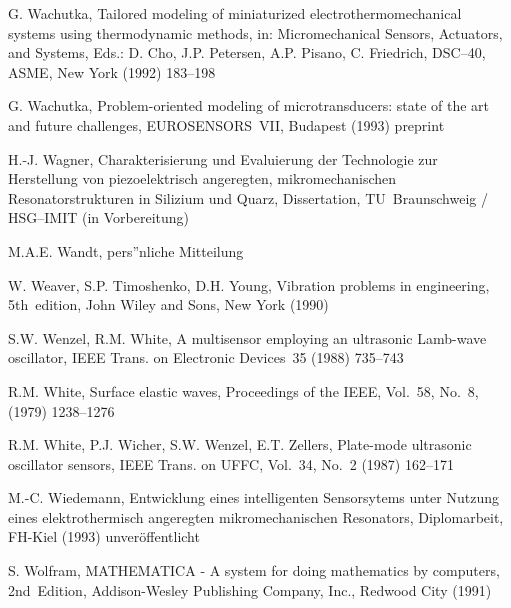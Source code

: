 \begin{thebibliography}{xxx}
 G. Wachutka, Tailored modeling of miniaturized electrothermomechanical
 systems using thermodynamic methods, in: Micromechanical Sensors,
 Actuators, and Systems, Eds.: D. Cho, J.P. Petersen, A.P. Pisano,
 C. Friedrich, DSC--40, ASME, New York (1992) 183--198

 G. Wachutka, Problem-oriented modeling of microtransducers: state of the
 art and future challenges, EUROSENSORS~VII, Budapest (1993) preprint


 H.-J. Wagner, Charakterisierung und Evaluierung der Technologie zur
 Herstellung von piezoelektrisch angeregten, mikromechanischen
 Resonatorstrukturen in Silizium und Quarz, Dissertation,
 TU~Braunschweig / HSG--IMIT (in Vorbereitung)

 M.A.E. Wandt, pers”nliche Mitteilung

 W. Weaver, S.P. Timoshenko, D.H. Young, Vibration problems in engineering,
 5th~edition, John Wiley and Sons, New York (1990)

 S.W. Wenzel, R.M. White, A multisensor employing an ultrasonic Lamb-wave
 oscillator, IEEE Trans. on Electronic Devices~35 (1988) 735--743

 R.M. White, Surface elastic waves, Proceedings of the IEEE, Vol.~58, No.~8,
 (1979) 1238--1276

 R.M. White, P.J. Wicher, S.W. Wenzel, E.T. Zellers, Plate-mode ultrasonic
 oscillator sensors, IEEE Trans. on UFFC, Vol.~34, No.~2 (1987) 162--171

 M.-C. Wiedemann, Entwicklung eines intelligenten Sensorsytems unter Nutzung
 eines elektrothermisch angeregten mikromechanischen Resonators,
 Diplomarbeit, FH-Kiel (1993) unveröffentlicht

 S. Wolfram, {\sf MATHEMATICA} - A system for doing mathematics by computers,
 2nd~Edition, Addison-Wesley Publishing Company, Inc., Redwood City (1991)



\end{thebibliography}
